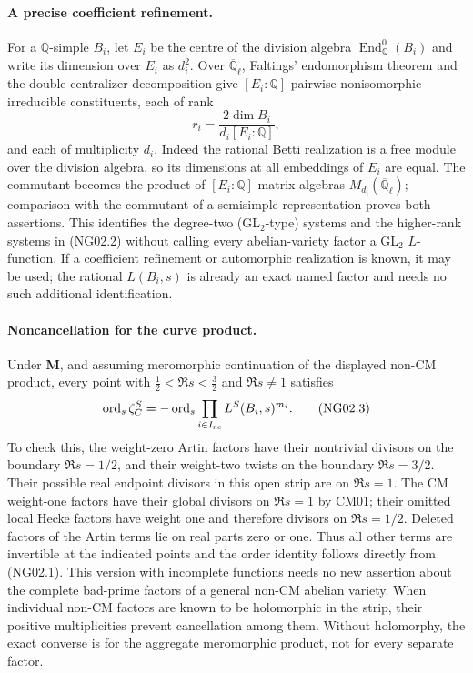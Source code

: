 \documentclass[11pt]{article}
\theoremstyle{remark}
\begin{document}
\paragraph{A precise coefficient refinement.}
For a $\mathbb Q$-simple $B_i$, let $E_i$ be the centre of the division
algebra $\operatorname{End}^0_{\mathbb Q}(B_i)$ and write its dimension
over $E_i$ as $d_i^2$.  Over $\overline{\mathbb Q}_\ell$, Faltings'
endomorphism theorem and the double-centralizer decomposition give
$[E_i:\mathbb Q]$ pairwise nonisomorphic irreducible constituents, each
of rank
\[
                  r_i=\frac{2\dim B_i}{d_i[E_i:\mathbb Q]},
\]
and each of multiplicity $d_i$.  Indeed the rational Betti realization
is a free module over the division algebra, so its dimensions at all
embeddings of $E_i$ are equal.  The commutant becomes the
product of $[E_i:\mathbb Q]$ matrix algebras
$M_{d_i}(\overline{\mathbb Q}_\ell)$; comparison with the commutant of
a semisimple representation proves both assertions.  This identifies
the degree-two (GL$_2$-type) systems and the higher-rank systems in
(NG02.2) without calling every abelian-variety factor a GL$_2$
$L$-function.  If a coefficient refinement or automorphic realization
is known, it may be used; the rational $L(B_i,s)$ is already an exact
named factor and needs no such additional identification.

\paragraph{Noncancellation for the curve product.}
Under \textbf{M}, and assuming meromorphic continuation of the displayed
non-CM product, every point with
$\tfrac12<\Re s<\tfrac32$ and $\Re s\ne1$ satisfies
\[
 \operatorname{ord}_s\zeta^S_C
       =-\operatorname{ord}_s
             \prod_{i\in I_{\rm nc}}L^S(B_i,s)^{m_i}.          \tag{NG02.3}
\]
To check this, the weight-zero Artin factors have their nontrivial
divisors on the boundary $\Re s=1/2$, and their weight-two twists on
the boundary $\Re s=3/2$.  Their possible real endpoint divisors in
this open strip are on $\Re s=1$.  The CM weight-one factors have
their global divisors on $\Re s=1$ by CM01; their omitted local
Hecke factors have weight one and therefore divisors on
$\Re s=1/2$.  Deleted factors of the Artin terms lie on real parts
zero or one.  Thus all other terms are invertible at the indicated
points and the order identity follows directly from (NG02.1).
This version with incomplete functions needs no new assertion about
the complete bad-prime factors of a general non-CM abelian variety.
When individual non-CM factors are known to be holomorphic
in the strip, their positive multiplicities prevent cancellation
among them.  Without holomorphy, the exact converse is for the
aggregate meromorphic product, not for every separate factor.
\end{document}
